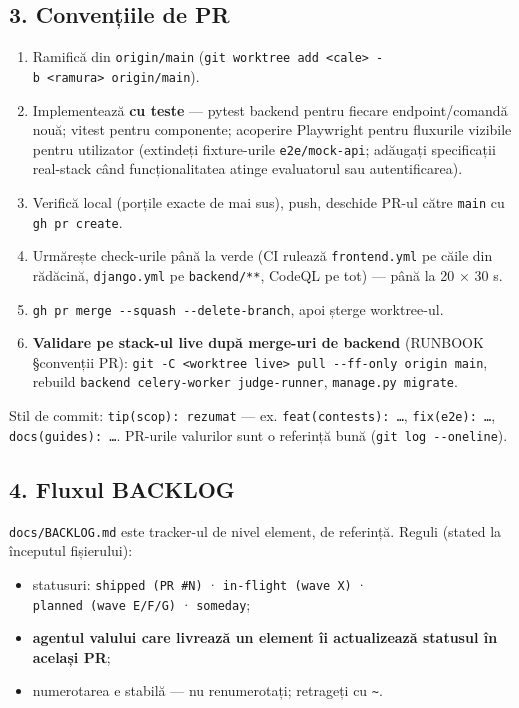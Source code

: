 \documentclass[
]{article}
\providecommand{\tightlist}{%
  \setlength{\itemsep}{0pt}\setlength{\parskip}{0pt}}
\begin{document}
\subsection{3. Convențiile de PR}\label{3-convenux21biile-de-pr}

\begin{enumerate}
\def\labelenumi{\arabic{enumi}.}
\tightlist
\item
  Ramifică din \texttt{origin/main}
  (\texttt{git\ worktree\ add\ \textless{}cale\textgreater{}\ -b\ \textless{}ramura\textgreater{}\ origin/main}).
\item
  Implementează \textbf{cu teste} --- pytest backend pentru fiecare
  endpoint/comandă nouă; vitest pentru componente; acoperire Playwright
  pentru fluxurile vizibile pentru utilizator (extindeți fixture-urile
  \texttt{e2e/mock-api}; adăugați specificații real-stack când
  funcționalitatea atinge evaluatorul sau autentificarea).
\item
  Verifică local (porțile exacte de mai sus), push, deschide PR-ul către
  \texttt{main} cu \texttt{gh\ pr\ create}.
\item
  Urmărește check-urile până la verde (CI rulează \texttt{frontend.yml}
  pe căile din rădăcină, \texttt{django.yml} pe \texttt{backend/**},
  CodeQL pe tot) --- până la 20 × 30 s.
\item
  \texttt{gh\ pr\ merge\ -\/-squash\ -\/-delete-branch}, apoi șterge
  worktree-ul.
\item
  \textbf{Validare pe stack-ul live după merge-uri de backend} (RUNBOOK
  §convenții PR):
  \texttt{git\ -C\ \textless{}worktree\ live\textgreater{}\ pull\ -\/-ff-only\ origin\ main},
  rebuild \texttt{backend\ celery-worker\ judge-runner},
  \texttt{manage.py\ migrate}.
\end{enumerate}

Stil de commit: \texttt{tip(scop):\ rezumat} --- ex.
\texttt{feat(contests):\ …}, \texttt{fix(e2e):\ …},
\texttt{docs(guides):\ …}. PR-urile valurilor sunt o referință bună
(\texttt{git\ log\ -\/-oneline}).

\subsection{4. Fluxul BACKLOG}\label{4-fluxul-backlog}

\texttt{docs/BACKLOG.md} este tracker-ul de nivel element, de referință.
Reguli (stated la începutul fișierului):

\begin{itemize}
\tightlist
\item
  statusuri: \texttt{shipped\ (PR\ \#N)} · \texttt{in-flight\ (wave\ X)}
  · \texttt{planned\ (wave\ E/F/G)} · \texttt{someday};
\item
  \textbf{agentul valului care livrează un element îi actualizează
  statusul în același PR};
\item
  numerotarea e stabilă --- nu renumerotați; retrageți cu
  \texttt{\textasciitilde{}}.
\end{itemize}
\end{document}
